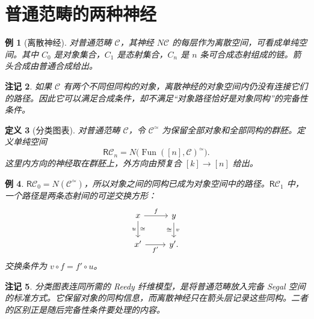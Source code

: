 \documentclass[12pt,oneside,openany,fontset=none]{ctexbook}
\theoremstyle{cn}
\newtheorem{definition}{定义}[chapter]
\newtheorem{example}[definition]{例}
\newtheorem{remark}[definition]{注记}
\numberwithin{equation}{chapter}
\newcommand{\Fun}{\operatorname{Fun}}
\begin{document}
\section{普通范畴的两种神经}
\begin{example}[离散神经]
对普通范畴 $\mathcal C$，其神经 $N\mathcal C$ 的每层作为离散空间，可看成单纯空间。其中 $C_0$ 是对象集合，$C_1$ 是态射集合，$C_n$ 是 $n$ 条可合成态射组成的链。箭头合成由普通合成给出。
\end{example}
\begin{remark}
如果 $\mathcal C$ 有两个不同但同构的对象，离散神经的对象空间内仍没有连接它们的路径。因此它可以满足合成条件，却不满足“对象路径恰好是对象同构”的完备性条件。
\end{remark}
\begin{definition}[分类图表]
对普通范畴 $\mathcal C$，令 $\mathcal C^\simeq$ 为保留全部对象和全部同构的群胚。定义单纯空间
\[
\mathsf{R}\mathcal C_n
=N\bigl(\Fun([n],\mathcal C)^\simeq\bigr).
\]
这里内方向的神经取在群胚上，外方向由预复合 $[k]\to[n]$ 给出。
\end{definition}
\begin{example}
$\mathsf{R}\mathcal C_0=N(\mathcal C^\simeq)$，所以对象之间的同构已成为对象空间中的路径。$\mathsf{R}\mathcal C_1$ 中，一个路径是两条态射间的可逆交换方形：
\[
\begin{tikzcd}
x\ar[r,"f"]\ar[d,"u"',"\cong"]&y\ar[d,"v","\cong"']\\
x'\ar[r,"f'"']&y'.
\end{tikzcd}
\]
交换条件为 $v\circ f=f'\circ u$。
\end{example}
\begin{remark}
分类图表连同所需的 Reedy 纤维模型，是将普通范畴放入完备 Segal 空间的标准方式。它保留对象的同构信息，而离散神经只在箭头层记录这些同构。二者的区别正是随后完备性条件要处理的内容\cite{Rezk}。
\end{remark}
\end{document}
